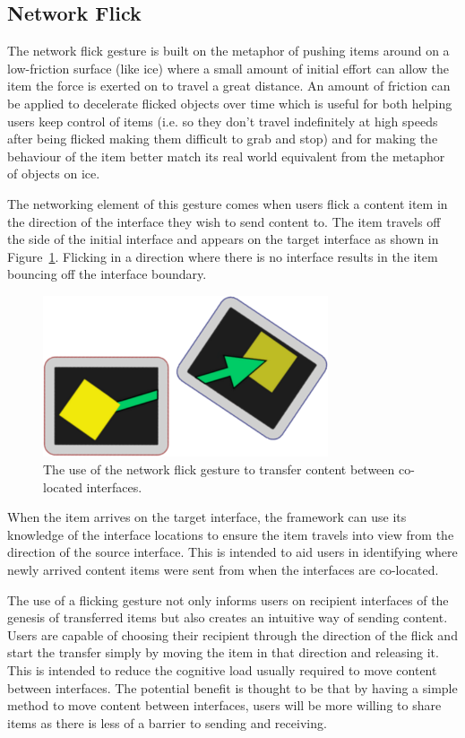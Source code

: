 \documentclass[a4paper,11pt]{article}
\begin{document}
\subsection{Network Flick}

The network flick gesture is built on the metaphor of pushing items around on a low-friction surface (like ice) where a small amount of initial effort can allow the item the force is exerted on to travel a great distance.
An amount of friction can be applied to decelerate flicked objects over time which is useful for both helping users keep control of items (i.e.
so they don't travel indefinitely at high speeds after being flicked making them difficult to grab and stop) and for making the behaviour of the item better match its real world equivalent from the metaphor of objects on ice.

The networking element of this gesture comes when users flick a content item in the direction of the interface they wish to send content to.
The item travels off the side of the initial interface and appears on the target interface as shown in Figure~\ref{fig:FlickExample}.
Flicking in a direction where there is no interface results in the item bouncing off the interface boundary.

\begin{figure}[h]
 \centering
   \includegraphics[width=0.75\textwidth]{figures/flickexample.png}
   \caption{The use of the network flick gesture to transfer content between co-located interfaces.}
   \label{fig:FlickExample}
\end{figure}

When the item arrives on the target interface, the framework can use its knowledge of the interface locations to ensure the item travels into view from the direction of the source interface.
This is intended to aid users in identifying where newly arrived content items were sent from when the interfaces are co-located.

The use of a flicking gesture not only informs users on recipient interfaces of the genesis of transferred items but also creates an intuitive way of sending content.
Users are capable of choosing their recipient through the direction of the flick and start the transfer simply by moving the item in that direction and releasing it.
This is intended to reduce the cognitive load usually required to move content between interfaces.
The potential benefit is thought to be that by having a simple method to move content between interfaces, users will be more willing to share items as there is less of a barrier to sending and receiving.
\end{document}
